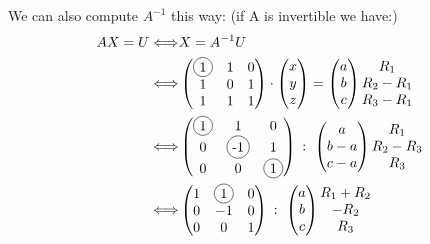 \documentclass[notitlepage]{math}
\begin{document}
We can also compute $A^{-1}$ this way: (if A is invertible we have:)
\begin{align*}
AX = U  \Longleftrightarrow& X = A^{-1}U \\
\Longleftrightarrow& \begin{pmatrix}
    \circled{1} & 1 & 0 \\
    1 & 0 & 1 \\
    1 & 1 & 1
\end{pmatrix} \cdot \begin{pmatrix} x \\ y \\ z \end{pmatrix} = \begin{pmatrix} a \\ b \\ c \end{pmatrix} \begin{matrix}R_1 \\ R_2-R_1 \\ R_3-R_1\end{matrix}  \\
\Longleftrightarrow& \begin{pmatrix} 
    \circled{1} & 1 & 0 \\
    0 & \circled{-1} & 1 \\
    0 & 0 & \circled{1} 
\end{pmatrix} \text{ : } \begin{pmatrix} a \\ b-a \\ c-a \end{pmatrix} \begin{matrix}R_1 \\ R_2-R_3 \\ R_3\end{matrix}  \\
\Longleftrightarrow& \begin{pmatrix} 
    1 &\circled{1}  & 0 \\
    0 & -1 & 0 \\
    0 & 0 & 1
\end{pmatrix} \text{ : } \begin{pmatrix} a \\ b \\ c \end{pmatrix} \begin{matrix}R_1 +R_2 \\ -R_2 \\ R_3\end{matrix}  \\

\end{align*}
\end{document}
